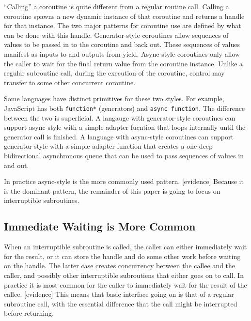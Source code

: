 \documentclass[a4paper,UKenglish,cleveref, autoref]{lipics-v2019}
\begin{document}
``Calling'' a coroutine is quite different from a regular routine call.
Calling a coroutine spawns a new dynamic instance of that coroutine and returns a handle for that instance\footnotemark{}.
The two major patterns for coroutine use are defined by what can be done with this handle.
Generator-style coroutines allow sequences of values to be passed in to the coroutine and back out.
These sequences of values manifest as inputs to and outputs from yield.
Async-style coroutines only allow the caller to wait for the final return value from the coroutine instance.
Unlike a regular subroutine call, during the execution of the coroutine, control may transfer to some other concurrent coroutine.


Some languages have distinct primitives for these two styles.
For example, JavaScript has both \texttt{function*} (generators) and \texttt{async function}.
The difference between the two is superficial.
A langauge with generator-style coroutines can support async-style with a simple adapter fucntion that loops internally until the generator call is finished.
A language with async-style coroutines can support generator-style with a simple adapter function that creates a one-deep bidirectional asynchronous queue that can be used to pass sequences of values in and out.

In practice async-style is the more commonly used pattern.
[evidence]
Because it is the dominant pattern, the remainder of this paper is going to focus on interruptible subroutines.

\subsection{Immediate Waiting is More Common}

When an interruptible subroutine is called, the caller can either immediately wait for the result, or it can store the handle and do some other work before waiting on the handle.
The latter case creates concurrency between the callee and the caller, and possibly other interruptible subroutiens that either goes on to call.
In practice it is most common for the caller to immediately wait for the result of the callee.
[evidence]
This means that basic interface going on is that of a regular subroutine call, with the essential difference that the call might be interrupted before returning.
\end{document}
